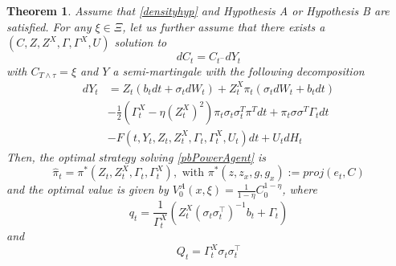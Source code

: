 \documentclass[11pt,a4paper]{article}
\theoremstyle{thmstyleone}%
\newtheorem{theorem}{Theorem}%
\theoremstyle{thmstyletwo}%
\theoremstyle{thmstylethree}%
\newcommand{\T}{T \wedge \tau}
\begin{document}
\begin{theorem}
    Assume that \ref{densityhyp} and Hypothesis A or Hypothesis B are satisfied. For any $\xi\in \Xi$, let us further assume that there exists a $(C, Z, Z^X, \Gamma, \Gamma^X, U)$ solution to 
    \[
        dC_t = C_{t^-} dY_t
    \]
    with $C_{\T} = \xi$ and $Y$ a semi-martingale with the following decomposition
    \begin{align}\label{contract}
        dY_t&= Z_t(b_t dt + \sigma_t dW_t) + Z_t^X \pi_t(\sigma_t dW_t + b_t dt)\nonumber \\
        &- \frac{1}{2} (\Gamma_t^X -\eta (Z_t^X)^2 ) \pi_t \sigma_t \sigma_t^T \pi^T dt + \pi_t \sigma \sigma^T \Gamma_t dt\\
        &- F(t, Y_t, Z_t, Z_t^X, \Gamma_t, \Gamma_t^X, U_t) dt + U_t dH_t \nonumber
    \end{align}
    Then, the optimal strategy solving \eqref{pbPowerAgent} is 
    \begin{equation}
        \hat\pi_t =\pi^*(Z_t, Z_t^X, \Gamma_t, \Gamma^X_t),\text{ with }\pi^*(z,z_x,g,g_x):= proj(e_t, C)
    \end{equation}
    and the optimal value is given by $V^A_0(x, \xi) = \frac{1}{1-\eta}C_0^{1-\eta}$, where
    \[
        q_t = \frac{1}{\Gamma^X_t}(Z^X_t (\sigma_t \sigma_t^{\top})^{-1}b_t + \Gamma_t)
    \]
    and
    \[
        Q_t = \Gamma^X_t \sigma_t \sigma_t^{\top}
    \]
\end{theorem}
\end{document}
